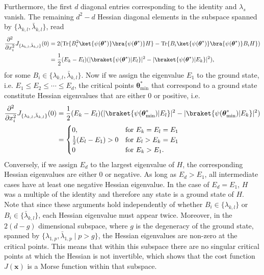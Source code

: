 \documentclass{article}
\renewcommand{\vec}[1]{\ensuremath{\boldsymbol{#1}}}
\begin{document}
Furthermore, the first \(d\) diagonal entries corresponding to the identity and \(\lambda_s\) vanish. The remaining \(d^2-d\) Hessian diagonal elements in the subspace spanned by \(\{\lambda_{k,l}, \bar{\lambda}_{k, l}\}\), read
\begin{align}
\label{eq:diagonal_hessian}
\frac{\partial^2}{\partial x_i^2} J_{\{\lambda_{k,l}, \bar{\lambda}_{k,l}\}}(0) & = 2(\mathrm{Tr}\{B_i^2\ket{\psi(\vec{\theta}^*)}\bra{\psi(\vec{\theta}^*)} H\} - \mathrm{Tr}\{B_i \ket{\psi(\vec{\theta}^*)} \bra{\psi(\vec{\theta}^*)} B_i H\}) \nonumber \\
    &= \frac{1}{2}(E_k - E_l)(\lvert \braket{\psi(\vec{\theta}^*) | E_l}\rvert^2 - \lvert \braket{\psi(\vec{\theta}^*) | E_k}\rvert^2),
\end{align}
for some \(B_i \in \{\lambda_{k, l}, \bar{\lambda}_{k,l}\}\). Now if we assign the eigenvalue \(E_1\) to the ground state, i.e. \(E_1 \leq E_2 \leq \cdots \leq E_d\), the critical points \(\vec{\theta}^*_\mathrm{min}\) that correspond to a ground state constitute Hessian eigenvalues that are either 0 or positive, i.e.
\begin{align}
    \frac{\partial^2}{\partial x_i^2} J_{\{\lambda_{k,l}, \bar{\lambda}_{k,l}\}}(0) & = \frac{1}{2}(E_k - E_l)(\lvert \braket{\psi(\vec{\theta}^*_\mathrm{min}) | E_l}\rvert^2 - \lvert \braket{\psi(\vec{\theta}^*_\mathrm{min}) | E_k}\rvert^2) \nonumber \\
    & = \begin{cases}
        0, & \text{for } E_k = E_l = E_1 \\
        \frac{1}{2}(E_l - E_1) > 0 & \text{for } E_l > E_k = E_1 \\
        0 & \text{for } E_k > E_1.
    \end{cases}
\end{align}
Conversely, if we assign \(E_d\) to the largest eigenvalue of \(H\), the corresponding Hessian eigenvalues are either 0 or negative. As long as \(E_d > E_1\), all intermediate cases have at least one negative Hessian eigenvalue. In the case of \(E_d = E_1\), \(H\) was a multiple of the identity and therefore any state is a ground state of \(H\). Note that since these arguments hold independently of whether \(B_i \in \{\lambda_{k, l}\}\) or \(B_i \in \{\bar{\lambda}_{k,l}\}\), each Hessian eigenvalue must appear twice. Moreover, in the \(2(d-g)\) dimensional subspace, where \(g\) is the degeneracy of the ground state, spanned by \(\{\lambda_{1, p}, \bar{\lambda}_{1, p} \mid p > g\}\), the Hessian eigenvalues are non-zero at the critical points. This means that within this subspace there are no singular critical points at which the Hessian is not invertible, which shows that the cost function \(J(\vec{x})\) is a Morse function within that subspace.
\end{document}
